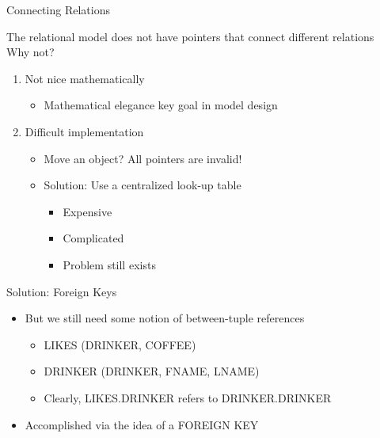 \documentclass[aspectratio=169]{beamer}
\begin{document}
\begin{frame}{Connecting Relations}

The relational model does not have pointers that connect different relations\\
\vspace{1em}
Why not? 
	\begin{enumerate}
	\item Not nice mathematically 
		\begin{itemize}
		\item Mathematical elegance key goal in model design
		\end{itemize}
	\item Difficult implementation 
		\begin{itemize}
		\item Move an object?  All pointers are invalid!
		\item Solution: Use  a centralized look-up table
		\begin{itemize}
		\item Expensive
		\item Complicated
		\item Problem still exists	
		\end{itemize}
		\end{itemize}
	\end{enumerate}
\end{frame}

\begin{frame}{Solution: Foreign Keys}

\begin{itemize}
\item But we still need some notion of between-tuple references
	\begin{itemize}
	\item LIKES (DRINKER, COFFEE)
	\item DRINKER (DRINKER, FNAME, LNAME)
	\item Clearly, LIKES.DRINKER refers to DRINKER.DRINKER
	\end{itemize}
\item Accomplished via the idea of a FOREIGN KEY
\end{itemize}
\end{frame}
\end{document}
